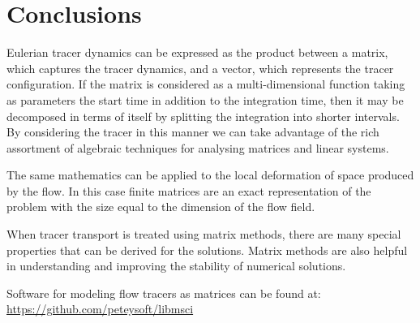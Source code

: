 \section{Conclusions}

Eulerian tracer dynamics can be expressed as the product between a matrix,
which captures the tracer dynamics, and a vector, which represents the tracer
configuration.  If the matrix is considered as a multi-dimensional function
taking as parameters the start time 
in addition to the integration time, then it may be decomposed in terms of
itself by splitting the integration into shorter intervals.  
By considering the tracer in this manner we can take advantage of the rich
assortment of algebraic techniques for analysing matrices and linear systems.

The same mathematics can be applied to the local deformation of space produced
by the flow.  In this case finite matrices are an exact representation of the problem with the size equal to the dimension of the flow field.

When tracer transport is treated using matrix methods, there
are many special properties that can be derived for the solutions.  
Matrix methods are also
helpful in understanding and improving the stability of numerical solutions.

Software for modeling flow tracers as matrices can be found at:
\url{https://github.com/peteysoft/libmsci}



